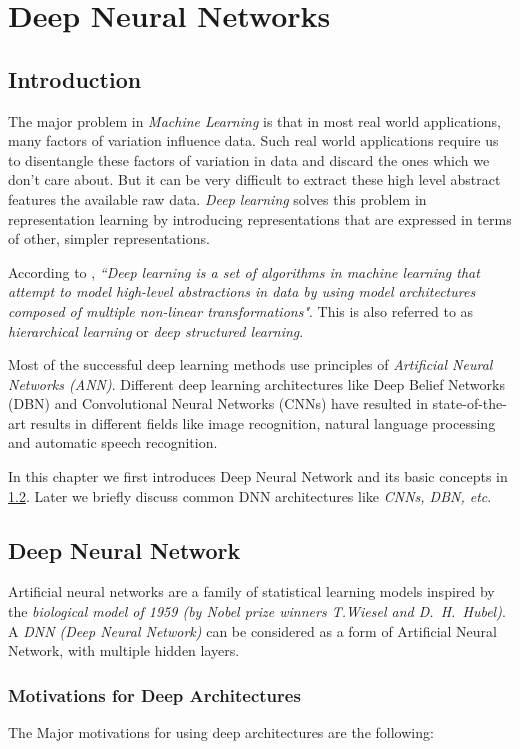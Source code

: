 \chapter{Deep Neural Networks}
\label{chap:dnn}
\section{Introduction}
The major problem in \textit{Machine Learning} is that in most real world applications, many factors of variation influence data. Such real world applications require us to disentangle these factors of variation in data and discard the ones which we don't care about. But it can be very difficult to extract these high level abstract features the available raw data. \textit{Deep learning} solves this problem in representation learning by introducing representations that are expressed in terms of other, simpler representations.

According to \citet{deng2014deep}, \textit{``Deep learning is a set of algorithms in machine learning that attempt to model high-level abstractions in data by using model architectures composed of multiple non-linear transformations"}. This is also referred to as \textit{hierarchical learning} or \textit{deep structured learning}. 

Most of the successful deep learning methods use principles of \textit{Artificial Neural Networks (ANN)}. Different deep learning architectures like Deep Belief Networks (DBN) and Convolutional Neural Networks (CNNs) have resulted in state-of-the-art results in different fields like image recognition, natural language processing and automatic speech recognition.

In this chapter we first introduces Deep Neural Network and its basic concepts in \ref{sec:dnn:dnn}. Later we briefly discuss common DNN architectures like \textit{CNNs, DBN, etc}.

\section{Deep Neural Network}
\label{sec:dnn:dnn}
Artificial neural networks are a family of statistical learning models inspired by the \textit{biological model of 1959 (by Nobel prize winners T.Wiesel and D.~H.~Hubel)}. A \textit{DNN (Deep Neural Network)} can be considered as a form of Artificial Neural Network, with multiple hidden layers. 


\subsection{Motivations for Deep Architectures}
The Major motivations for using deep architectures are the following:

